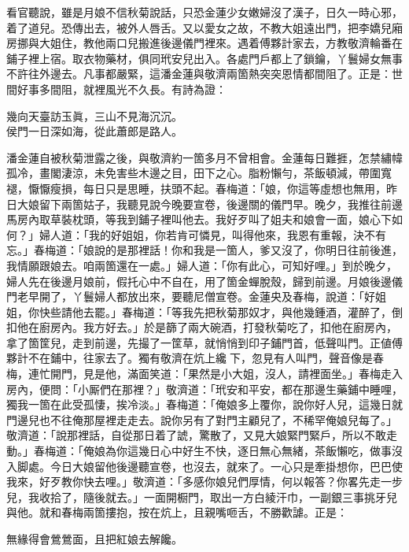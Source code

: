 看官聽說，雖是月娘不信秋菊說話，只恐金蓮少女嫩婦沒了漢子，日久一時心邪，着了道兒。恐傳出去，被外人唇舌。又以愛女之故，不教大姐遠出門，把李嬌兒廂房挪與大姐住，教他兩口兒搬進後邊儀門裡來。遇着傅夥計家去，方教敬濟輪番在鋪子裡上宿。取衣物藥材，俱同玳安兒出入。各處門戶都上了鎖鑰，丫鬟婦女無事不許往外邊去。凡事都嚴緊，這潘金蓮與敬濟兩箇熱突突恩情都間阻了。正是：世間好事多間阻，就裡風光不久長。有詩為證：

\begin{myquote}
幾向天臺訪玉眞，三山不見海沉沉。\\侯門一日深如海，從此蕭郎是路人。
\end{myquote}

潘金蓮自被秋菊泄露之後，與敬濟約一箇多月不曾相會。金蓮每日難捱，怎禁繡幃孤冷，畫閣淒涼，未免害些木邊之目，田下之心。脂粉懶勻，茶飯頓減，帶圍寬褪，懨懨瘦損，每日只是思睡，扶頭不起。春梅道：「娘，你這等虛想也無用，昨日大娘留下兩箇姑子，我聽見說今晚要宣卷，後邊關的儀門早。晚夕，我推往前邊馬房內取草裝枕頭，等我到鋪子裡叫他去。我好歹叫了姐夫和娘會一面，娘心下如何？」婦人道：「我的好姐姐，你若肯可憐見，叫得他來，我恩有重報，決不有忘。」{}春梅道：「娘說的是那裡話！你和我是一箇人，爹又沒了，你明日往前後進，我情願跟娘去。咱兩箇還在一處。」婦人道：「你有此心，可知好哩。」到於晚夕，婦人先在後邊月娘前，假托心中不自在，用了箇金蟬脫殼，歸到前邊。月娘後邊儀門老早開了，丫鬟婦人都放出來，要聽尼僧宣卷。金蓮央及春梅，說道：「好姐姐，你快些請他去罷。」春梅道：「等我先把秋菊那奴才，與他幾鍾酒，灌醉了，倒扣他在廚房內。我方好去。」於是篩了兩大碗酒，打發秋菊吃了，扣他在廚房內，拿了箇筐兒，走到前邊，先撮了一筐草，就悄悄到印子鋪門首，低聲叫門。正値傅夥計不在鋪中，往家去了。獨有敬濟在炕上纔𢱉下，忽見有人叫門，聲音像是春梅，連忙開門，見是他，滿面笑道：「果然是小大姐，沒人，請裡面坐。」春梅走入房內，便問：「小厮們在那裡？」{}敬濟道：「玳安和平安，都在那邊生藥鋪中睡哩，獨我一箇在此受孤悽，挨冷淡。」春梅道：「俺娘多上覆你，說你好人兒，這幾日就門邊兒也不往俺那屋裡走走去。說你另有了對門主顧兒了，不稀罕俺娘兒每了。」敬濟道：「說那裡話，自從那日着了諕，驚散了，又見大娘緊門緊戶，所以不敢走動。」春梅道：「俺娘為你這幾日心中好生不快，逐日無心無緒，茶飯懶吃，做事沒入脚處。今日大娘留他後邊聽宣卷，也沒去，就來了。一心只是牽掛想你，巴巴使我來，好歹教你快去哩。」敬濟道：「多感你娘兒們厚情，何以報答？你畧先走一步兒，我收拾了，隨後就去。」一面開橱門，取出一方白綾汗巾，一副銀三事挑牙兒與他。就和春梅兩箇摟抱，按在炕上，且親嘴咂舌，不勝歡謔。正是：

\begin{myquote}
無緣得會鶯鶯面，且把紅娘去解饞。
\end{myquote}

